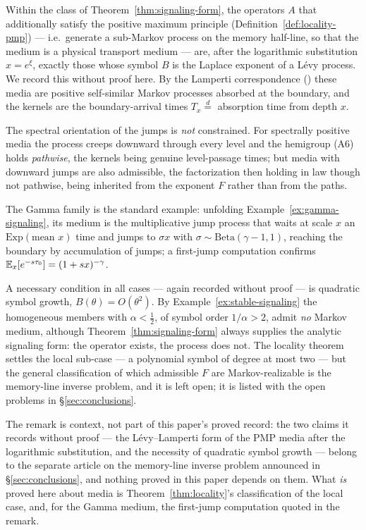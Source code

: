 \begin{remark}\label{rem:markov-media}
Within the class of Theorem~\ref{thm:signaling-form}, the operators $A$ that additionally
satisfy the positive maximum principle (Definition~\ref{def:locality-pmp}) --- i.e.\ generate a
sub-Markov process on the memory half-line, so that the medium is a physical transport medium
--- are, after the logarithmic substitution $x = e^\xi$, exactly those whose symbol $B$ is
the Laplace exponent of a Lévy process. We record this without proof here. By the
Lamperti correspondence () these media are positive
self-similar Markov processes absorbed at the boundary, and the kernels are the
boundary-arrival times $T_x \stackrel{d}{=}$ absorption time from depth $x$.

The spectral orientation of the jumps is \emph{not} constrained. For spectrally positive media
the process creeps downward through every level and the hemigroup (A6) holds \emph{pathwise},
the kernels being genuine level-passage times; but media with downward jumps are also
admissible, the factorization then holding in law though not pathwise, being inherited from
the exponent $F$ rather than from the paths.

The Gamma family is the standard example: unfolding Example~\ref{ex:gamma-signaling}, its
medium is the multiplicative jump process that waits at scale $x$ an
$\mathrm{Exp}(\text{mean } x)$ time and jumps to $\sigma x$ with
$\sigma \sim \mathrm{Beta}(\gamma-1, 1)$, reaching the boundary by accumulation of jumps; a
first-jump computation confirms $\mathbb{E}_x[e^{-s\tau_0}] = (1+sx)^{-\gamma}$.

A necessary condition in all cases --- again recorded without proof --- is quadratic symbol
growth, $B(\theta) = O(\theta^2)$. By Example~\ref{ex:stable-signaling} the homogeneous members
with $\alpha < \tfrac12$, of symbol order $1/\alpha > 2$, admit \emph{no} Markov medium, although
Theorem~\ref{thm:signaling-form} always supplies the analytic signaling form: the operator
exists, the process does not. The locality theorem settles the local sub-case --- a polynomial
symbol of degree at most two --- but the general classification of which admissible $F$ are
Markov-realizable is the memory-line inverse problem, and it is left open; it is listed with the
open problems in \S\ref{sec:conclusions}.
\end{remark}

The remark is context, not part of this paper's proved record: the two claims it records
without proof --- the L\'evy--Lamperti form of the PMP media after the logarithmic
substitution, and the necessity of quadratic symbol growth --- belong to the separate
article on the memory-line inverse problem announced in \S\ref{sec:conclusions}, and
nothing proved in this paper depends on them. What \emph{is} proved here about media is
Theorem~\ref{thm:locality}'s classification of the local case, and, for the Gamma medium,
the first-jump computation quoted in the remark.

